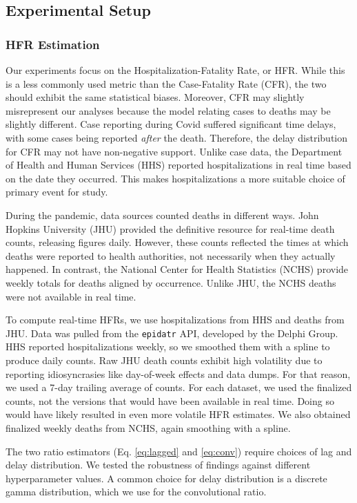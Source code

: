 \documentclass{article}
\begin{document}
\subsection{Experimental Setup}
\subsubsection{HFR Estimation}
Our experiments focus on the Hospitalization-Fatality Rate, or HFR. While this is a less commonly used metric than the Case-Fatality Rate (CFR), the two should exhibit the same statistical biases. Moreover, CFR may slightly misrepresent our analyses because the model relating cases to deaths may be slightly different. Case reporting during Covid suffered significant time delays, with some cases being reported \textit{after} the death. Therefore, the delay distribution for CFR may not have non-negative support. Unlike case data, the Department of Health and Human Services (HHS) reported hospitalizations in real time based on the date they occurred. This makes hospitalizations a more suitable choice of primary event for study. 

During the pandemic, data sources counted deaths in different ways. John Hopkins University (JHU) provided the definitive resource for real-time death counts, releasing figures daily. However, these counts reflected the times at which deaths were reported to health authorities, not necessarily when they actually happened. In contrast, the National Center for Health Statistics (NCHS) provide weekly totals for deaths aligned by occurrence. Unlike JHU, the NCHS deaths were not available in real time.

To compute real-time HFRs, we use hospitalizations from HHS and deaths from JHU. Data was pulled from the \texttt{epidatr} API, developed by the Delphi Group. HHS reported hospitalizations weekly, so we smoothed them with a spline to produce daily counts. Raw JHU death counts exhibit high volatility due to reporting idiosyncrasies like day-of-week effects and data dumps. For that reason, we used a 7-day trailing average of counts. For each dataset, we used the finalized counts, not the versions that would have been available in real time. Doing so would have likely resulted in even more volatile HFR estimates. We also obtained finalized weekly deaths from NCHS, again smoothing with a spline.

The two ratio estimators (Eq. \ref{eq:lagged} and \ref{eq:conv}) require choices of lag and delay distribution. We tested the robustness of findings against different hyperparameter values. A common choice for delay distribution is a discrete gamma distribution, which we use for the convolutional ratio.
\end{document}
